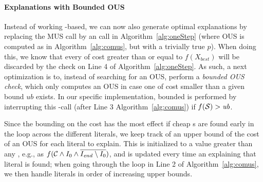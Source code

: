 \paragraph{Explanations with Bounded OUS}
Instead of working \comus-based, we can now also generate optimal explanations by replacing the MUS call by an \omus call  in Algorithm~\ref{alg:oneStep} (where OUS is computed as in Algorithm~\ref{alg:comus}, but with a trivially true $p$). 
When doing this, we know that every \comus of cost greater than or equal to $f(X_{\mathit{best}})$ will be discarded by the check on Line 4 of Algorithm~\ref{alg:oneStep}.
As such, a next optimization is to, instead of searching for an OUS, perform a \emph{bounded OUS check}, which only computes an OUS in case one of cost smaller than a given bound $\mathit{ub}$ exists.  
In our specific implementation, bounded \omus is performed by interrupting this \omus-call (after Line 3 Algorithm~\ref{alg:comus}) if $f(\mathcal{S}) > \mathit{ub}$.

Since the bounding on the \omus cost has the most effect if cheap \omus{}s are found early in the loop across the different literals, we keep track of an upper bound of the cost of an OUS for each literal to explain. This is initialized to a value greater than any \omus, e.g., as $f(\mathcal{C}  \land I_0 \land \overline{I_\mathit{end}  \setminus I_0})$, and is updated every time an \omus explaining that literal is found; when going through the loop in Line 2 of Algorithm~\ref{alg:comus}, we then handle literals in order of increasing upper bounds.



